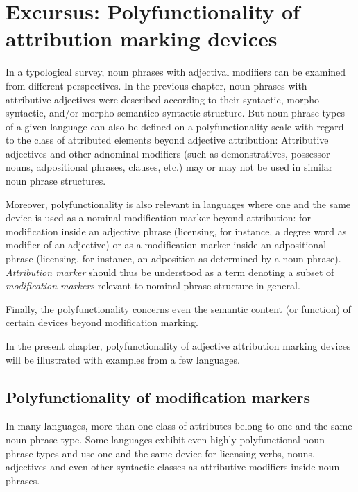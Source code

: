 
\chapter[Polyfunctionality]{Excursus: Polyfunctionality of attribution marking devices} \label{polyfunctionality}
In a typological survey, noun phrases with adjectival modifiers can be examined from different perspectives. In the previous chapter, noun phrases with attributive adjectives were described according to their syntactic, morpho-syntactic, and/or morpho-semantico-syn\-tac\-tic structure. But noun phrase types of a given language can also be defined on a polyfunctionality scale with regard to the class of attributed elements beyond adjective attribution: Attributive adjectives and other adnominal modifiers (such as demonstratives, possessor nouns, adpositional phrases, clauses, etc.) may or may not be used in similar noun phrase structures.

Moreover, polyfunctionality is also relevant in languages where one and the same device is used as a nominal modification marker beyond attribution: for modification inside an adjective phrase (licensing, for instance, a degree word as modifier of an adjective) or as a modification marker inside an adpositional phrase (licensing, for instance, an adposition as determined by a noun phrase). \textit{Attribution marker} should thus be understood as a term denoting a subset of \textit{modification markers} relevant to nominal phrase structure in general.

Finally, the polyfunctionality concerns even the semantic content (or function) of certain devices beyond modification marking. 

In the present chapter, polyfunctionality of adjective attribution marking devices will be illustrated with examples from a few languages.

\section{Polyfunctionality of modification markers}
In many languages, more than one class of attributes belong to one and the same noun phrase type. Some languages exhibit even highly polyfunctional noun phrase types and use one and the same device for licensing verbs, nouns, adjectives and even other syntactic classes as attributive modifiers inside noun phrases.

